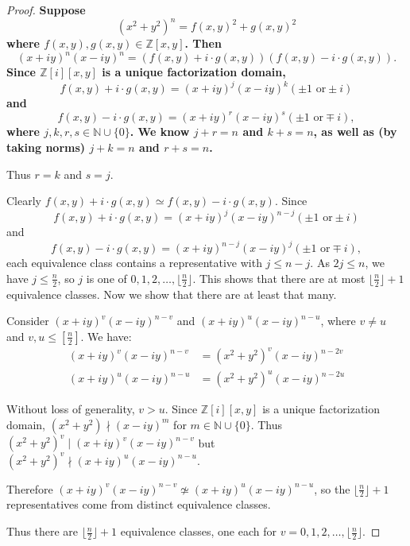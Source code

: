 \documentclass[12pt]{article}
\numberwithin{equation}{section}
\newcommand{\divides}{\mid}
\newcommand{\notdivides}{\nmid}
\begin{document}
\begin{landscape}
{{\begin{proof}
\bf
Suppose 
\[ (x^2 + y^2)^n = f(x,y)^2 + g(x,y)^2 \]
where \( f(x,y), g(x,y) \in \mathbb{Z}[x,y] \).
Then  
\[ (x + iy)^n (x -  iy)^n = ( f(x,y) + i \cdot g(x,y) ) ( f(x,y) - i \cdot g(x,y) ) .\]
Since \( \mathbb{Z} [i][x,y] \) is a unique factorization domain, 
\[ f(x,y) + i \cdot g(x,y) = (x + iy)^j (x -  iy)^k ( \pm 1 \text{ or} \pm i ) \]
and
\[ f(x,y) - i \cdot g(x,y) = (x + iy)^r (x -  iy)^s ( \pm 1 \text{ or} \mp i ), \]
where \( j, k, r, s \in \mathbb{N} \cup \{0\} \). 
We know \( j + r = n \) and \( k + s = n \), as well as (by taking norms) \( j + k = n \) and \( r + s = n \).

Thus \(r = k\) and \(s = j\).

Clearly \( f(x,y) + i \cdot g(x,y) \simeq  f(x,y) - i \cdot g(x,y) \).
Since 
\[ 
f(x,y) + i \cdot g(x,y) = (x + iy)^j (x -  iy)^{n-j} ( \pm 1 \text{ or} \pm i ) 
\]
and 
\[ 
f(x,y) - i \cdot g(x,y) = (x + iy)^{n-j} (x -  iy)^j ( \pm 1 \text{ or} \mp i ) ,
\]
each equivalence class contains a representative with \( j \leq n - j
\).  As \( 2j \leq n \), we have \( j \leq \frac{n}{2} \), so \( j \)
is one of \( 0, 1, 2, \ldots, \lfloor \frac{n}{2} \rfloor \). This shows
that there are at most \( \lfloor \frac{n}{2} \rfloor + 1 \)
equivalence classes. Now we show that there are at least that many.



Consider \( (x + iy)^v (x -  iy)^{n-v} \)  and \( (x + iy)^u (x -  iy)^{n-u} \),
where \( v \neq u \) and \(v,u \leq [ \frac{n}{2} ] \). We have:
\begin{align*}
(x + iy)^v (x -  iy)^{n-v} &= (x^2 + y^2)^v (x -  iy)^{n-2v}
\\
(x + iy)^u (x -  iy)^{n-u} &= (x^2 + y^2)^u (x -  iy)^{n-2u}
\end{align*}

Without loss of generality, \( v > u \). 
Since \( \mathbb{Z} [i][x,y] \) is a unique factorization domain,
\( (x^2 + y^2) \notdivides (x -  iy)^m \) for \( m \in \mathbb{N} \cup \{ 0 \} \).
Thus \( (x^2 + y^2)^v \divides (x + iy)^v (x -  iy)^{n-v} \)
but \( (x^2 + y^2)^v \notdivides (x + iy)^u (x -  iy)^{n-u} \).

Therefore \( (x + iy)^v (x -  iy)^{n-v} \not\simeq (x + iy)^u (x -  iy)^{n-u} \), 
so the \( \lfloor \frac{n}{2} \rfloor + 1 \) representatives come from
distinct equivalence classes.

Thus there are \( \lfloor \frac{n}{2} \rfloor + 1 \) equivalence classes, 
one each for \( v = 0, 1, 2, \ldots,  \lfloor \frac{n}{2} \rfloor \).
\end{proof}









}}
\end{landscape}
\end{document}
